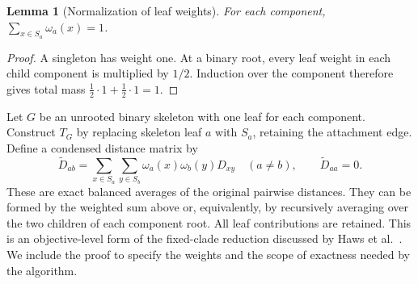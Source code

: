 \documentclass[11pt,a4paper]{article}
\makeatletter
\DeclareRobustCommand{\_}{\ifmmode\nfss@text{\textunderscore}\else\textunderscore\allowbreak\fi}
\newtheorem{lemma}[theorem]{Lemma}
\theoremstyle{definition}
\makeatother
\begin{document}
\begin{lemma}[Normalization of leaf weights]
\label{lem:normalization}
For each component, $\sum_{x\in S_a}\omega_a(x)=1$.
\end{lemma}
\begin{proof}
A singleton has weight one.
At a binary root, every leaf weight in each child component is multiplied by $1/2$.
Induction over the component therefore gives total mass
$\tfrac12\cdot1+\tfrac12\cdot1=1$.
\end{proof}

Let $G$ be an unrooted binary skeleton with one leaf for each component.
Construct $T_G$ by replacing skeleton leaf $a$ with $S_a$, retaining the attachment edge.
Define a condensed distance matrix by
\begin{equation}
 \widetilde D_{ab}
 =\sum_{x\in S_a}\sum_{y\in S_b}
    \omega_a(x)\omega_b(y)D_{xy}\quad(a\ne b),
 \qquad \widetilde D_{aa}=0.
 \label{eq:condensed_D}
\end{equation}
These are exact balanced averages of the original pairwise distances.
They can be formed by the weighted sum above or, equivalently, by recursively averaging over the two children of each component root.
All leaf contributions are retained.
This is an objective-level form of the fixed-clade reduction discussed by Haws et al.~\cite[Section~2.4]{haws2011optimality}.
We include the proof to specify the weights and the scope of exactness needed by the algorithm.
\end{document}
